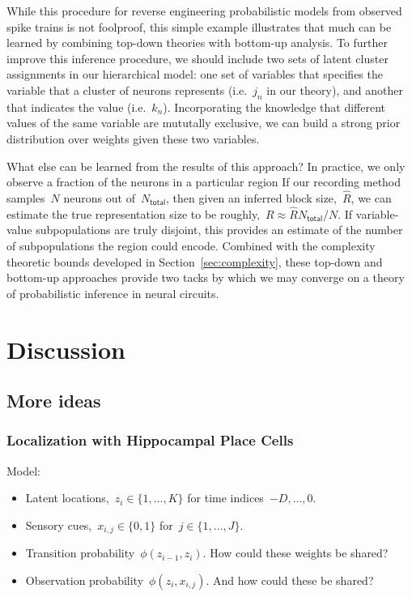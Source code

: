 While this procedure for reverse engineering probabilistic models
from observed spike trains is not foolproof, this simple example
illustrates that much can be learned by combining top-down theories
with bottom-up analysis. To further improve this inference procedure,
we should include two sets of latent cluster assignments in our
hierarchical model: one set of variables that specifies the
variable that a cluster of neurons represents (i.e.~$j_n$ in our
theory), and another that indicates the value (i.e.~$k_n$).
Incorporating the knowledge that different values of the same variable
are mututally exclusive, we can build a strong prior distribution
over weights given these two variables. 

What else can be learned from the results of this approach? In
practice, we only observe a fraction of the neurons in a particular
region If our recording method samples~$N$ neurons out
of~$N_{\mathsf{total}}$, then given an inferred block
size,~$\widehat{R}$, we can estimate the true representation size to
be roughly,~$R\approx \widehat{R} N_{\mathsf{total}} / N$. If variable-value
subpopulations are truly disjoint, this provides an estimate of the
number of subpopulations the region could encode. Combined with the
complexity theoretic bounds developed in Section~\ref{sec:complexity},
these top-down and bottom-up approaches provide two tacks  by which we may 
converge on a theory of probabilistic inference in neural circuits.

\section{Discussion}

\subsection{More ideas}

\subsubsection{Localization with Hippocampal Place Cells}

Model:
\begin{itemize}
\item Latent locations,~$z_i \in \{1, \ldots, K\}$ for time indices~$-D, \ldots, 0$.
\item Sensory cues,~$x_{i,j} \in \{0,1\}$ for~$j \in \{1, \ldots, J\}$.
\item Transition probability~$\phi(z_{i-1}, z_i)$. How could these weights be shared?
\item Observation probability~$\phi(z_{i}, x_{i,j})$. And how could these be shared?
\end{itemize}

